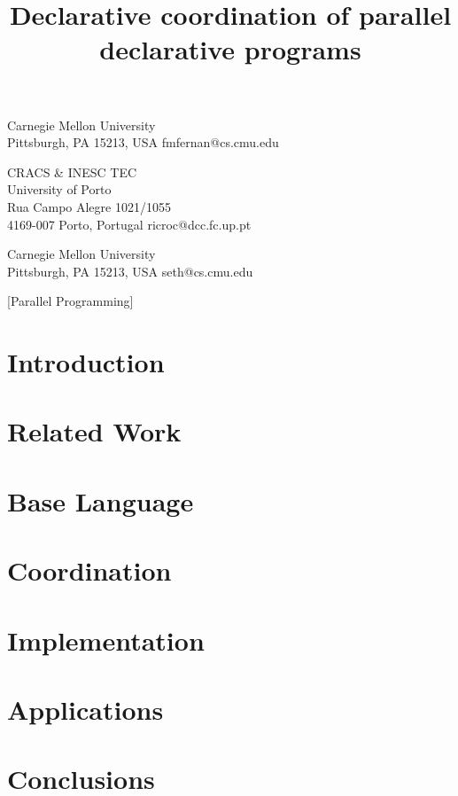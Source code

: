 \documentclass[pldi,blind,clearpagebib]{sigplanconf-pldi15}
\begin{document}
%
%

\title{Declarative coordination of parallel declarative programs}
           {Carnegie Mellon University\\Pittsburgh, PA 15213, USA}
           {fmfernan@cs.cmu.edu}

           {CRACS \& INESC TEC\\University of Porto\\Rua Campo Alegre 1021/1055\\4169-007 Porto, Portugal}
           {ricroc@dcc.fc.up.pt}

           {Carnegie Mellon University\\Pittsburgh, PA 15213, USA}
           {seth@cs.cmu.edu}

\newcommand{\scare}[1]{``#1''} 

\maketitle
\doublespacing
\begin{abstract}

\end{abstract}

[Parallel Programming]



\section{Introduction}


\section{Related Work}


\section{Base Language}\label{sec:language}


\section{Coordination}\label{sec:coordination}


\section{Implementation}\label{sec:implementation}


\section{Applications}\label{sec:applications}


\section{Conclusions}




\end{document}
